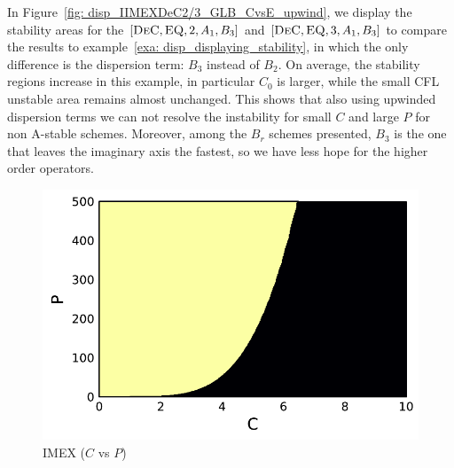 \begin{example}\label{exa: disp_displaying_stability_upwind}
	In Figure~\ref{fig: disp_IIMEXDeC2/3_GLB_CvsE_upwind}, we display the stability areas for the $[\textsc{DeC}, \textsc{EQ},2,A_1,B_3]$ and $[\textsc{DeC}, \textsc{EQ},3, A_1,B_3]$ to compare the results to example~\ref{exa: disp_displaying_stability}, in which the only difference is the dispersion term: $B_3$ instead of $B_2$.
	On average, the stability regions increase in this example, in particular $C_0$ is larger, while the small CFL unstable area remains almost unchanged.
	This shows that also using upwinded dispersion terms we can not resolve the instability for small $C$ and large $P$ for non A-stable schemes.
	Moreover, among the $B_{r}$ schemes presented, $B_3$ is the one that leaves the imaginary axis the fastest, so we have less hope for the higher order operators.
	\begin{figure}
		\centering
		\begin{minipage}[t]{0.32\textwidth}
			\centering
			\includegraphics[width=\textwidth]{pdf/pdepics/disp/contourf_adv_disp_IMEXDeC_equispaced_2_disp_Shu_adv_1_CP_long.pdf}
			IMEX  ($C$ vs $P$)
		\end{minipage}
		\begin{minipage}[t]{0.32\textwidth}
			\centering

\end{minipage}
\end{figure}
\end{example}
